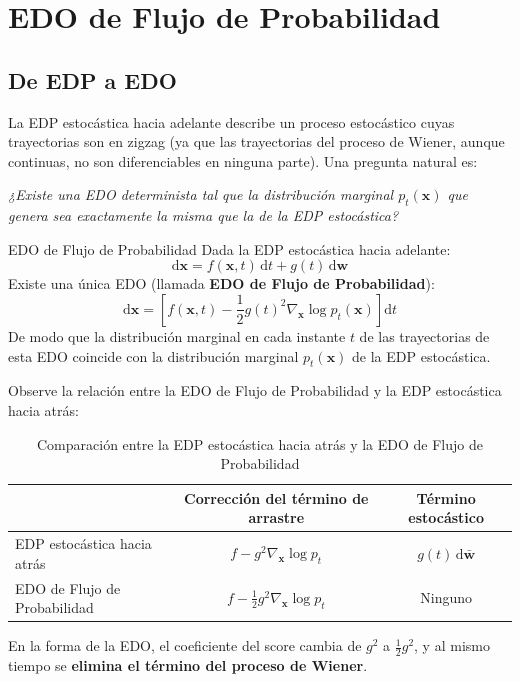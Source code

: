 \section{EDO de Flujo de Probabilidad}

\subsection{De EDP a EDO}

La EDP estocástica hacia adelante describe un proceso estocástico cuyas trayectorias son en zigzag (ya que las trayectorias del proceso de Wiener, aunque continuas, no son diferenciables en ninguna parte). Una pregunta natural es:

\textit{¿Existe una EDO determinista tal que la distribución marginal $p_t(\mathbf{x})$ que genera sea exactamente la misma que la de la EDP estocástica?}

\begin{importantbox}{EDO de Flujo de Probabilidad}
Dada la EDP estocástica hacia adelante:
$$
\mathrm{d}\mathbf{x} = f(\mathbf{x}, t)\,\mathrm{d}t + g(t)\,\mathrm{d}\mathbf{w}
$$
Existe una única EDO (llamada \textbf{EDO de Flujo de Probabilidad}):
$$
\mathrm{d}\mathbf{x} = \left[f(\mathbf{x}, t) - \frac{1}{2}g(t)^2 \nabla_{\mathbf{x}} \log p_t(\mathbf{x})\right]\mathrm{d}t
$$
De modo que la distribución marginal en cada instante $t$ de las trayectorias de esta EDO coincide con la distribución marginal $p_t(\mathbf{x})$ de la EDP estocástica.
\end{importantbox}

Observe la relación entre la EDO de Flujo de Probabilidad y la EDP estocástica hacia atrás:

\begin{table}[H]
\centering
\begin{tabular}{lcc}
\toprule
& \textbf{Corrección del término de arrastre} & \textbf{Término estocástico} \\
\midrule
EDP estocástica hacia atrás & $f - g^2 \nabla_{\mathbf{x}} \log p_t$ & $g(t)\,\mathrm{d}\bar{\mathbf{w}}$ \\
EDO de Flujo de Probabilidad & $f - \frac{1}{2} g^2 \nabla_{\mathbf{x}} \log p_t$ & Ninguno \\
\bottomrule
\end{tabular}
\caption{Comparación entre la EDP estocástica hacia atrás y la EDO de Flujo de Probabilidad}
\end{table}

En la forma de la EDO, el coeficiente del score cambia de $g^2$ a $\frac{1}{2}g^2$, y al mismo tiempo se \textbf{elimina el término del proceso de Wiener}.

